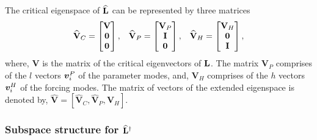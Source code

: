 The critical eigenspace of $\mathbf{\widehat{L}}$ can be represented by three matrices
\begin{align}
	\mathbf{\widehat{V}}_{C} = \begin{bmatrix}
		\mathbf{V} \\
		\boldsymbol{0} \\
		\boldsymbol{0}
	\end{bmatrix}, &&
	\mathbf{\widehat{V}}_{P} = \begin{bmatrix}
		\mathbf{V}_{P} \\
		\mathbf{I} \\
		\boldsymbol{0}
	\end{bmatrix}, &&
	\mathbf{\widehat{V}}_{H} = \begin{bmatrix}
		\mathbf{V}_{H} \\
		\boldsymbol{0} \\
		\mathbf{I}
	\end{bmatrix},
\end{align}
where, $\mathbf{V}$ is the matrix of the critical eigenvectors of $\mathbf{L}$. The matrix $\mathbf{V}_{P}$ comprises of the $l$ vectors $\boldsymbol{v}^{P}_{i}$ of the parameter modes, and, $\mathbf{V}_{H}$ comprises of the $h$ vectors $\boldsymbol{v}^{H}_{i}$ of the forcing modes. The matrix of vectors of the extended eigenspace is denoted by, $\mathbf{\widehat{V}} = [\mathbf{\widehat{V}}_{C}, \mathbf{\widehat{V}}_{P}, \mathbf{\widehat{V}}_{H}]$. 

\subsubsection{Subspace structure for $\mathbf{\widehat{L}}^{\dagger}$}

